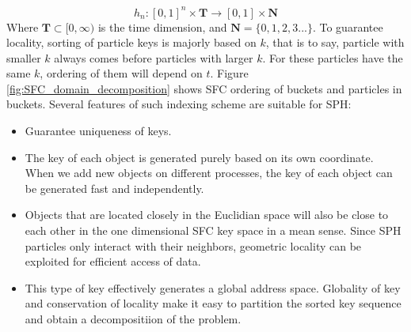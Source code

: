 \documentclass[procedia]{easychair}
\begin{document}
\begin{equation}
h_n: [0,1]^n \times \textbf{T} \rightarrow [0,1] \times \textbf{N}
\end{equation}
Where $\textbf{T} \subset [0,\infty)$ is the time dimension, and $\textbf{N}=\lbrace 0, 1, 2, 3...\rbrace$.
To guarantee locality, sorting of particle keys is majorly based on $k$, that is to say, particle with smaller $k$ always comes before particles with larger $k$. For these particles have the same $k$, ordering of them will depend on $t$. Figure \ref{fig:SFC_domain_decomposition} shows SFC ordering of buckets and particles in buckets. 
Several features of such indexing scheme are suitable for SPH:
\begin{itemize}
\item Guarantee uniqueness of keys.
\item The key of each object is generated purely based on its own coordinate. When we add new objects on different processes, the key of each object can be generated fast and independently.
\item Objects that are located closely in the Euclidian space will also be close to each other in the one dimensional SFC key space in a mean sense. Since SPH particles only interact with their neighbors, geometric locality can be exploited for efficient access of data.
\item This type of key effectively generates a global address space. Globality of key and conservation of locality make it easy to partition the sorted key sequence and obtain a decompositiion of the problem.
\end{itemize}
\end{document}
